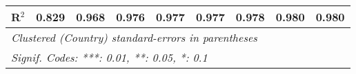 \begin{table}[htbp]
\begin{tabular}{lcccccccc}
      R$^2$                                                                             & 0.829   & 0.968   & 0.976         & 0.977         & 0.977          & 0.978          & 0.980         & 0.980\\  
      \midrule
      \multicolumn{9}{l}{\emph{Clustered (Country) standard-errors in parentheses}}\\
      \multicolumn{9}{l}{\emph{Signif. Codes: ***: 0.01, **: 0.05, *: 0.1}}\\
   \end{tabular}
\end{table}


